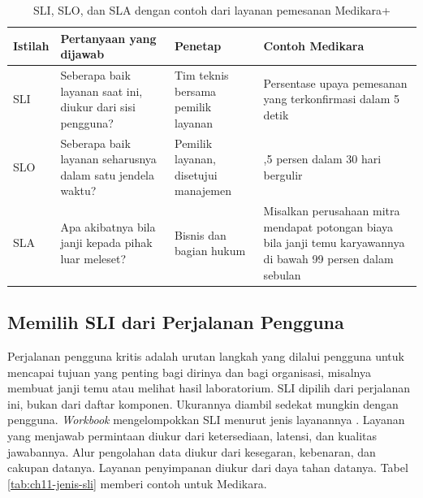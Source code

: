 \begin{table}[!htb]
  \centering
  \caption{SLI, SLO, dan SLA dengan contoh dari layanan pemesanan Medikara+}
  \label{tab:ch11-sli-slo-sla}
  \footnotesize
  \begin{tabularx}{\textwidth}{>{\raggedright\arraybackslash}p{1.1cm} >{\raggedright\arraybackslash}X >{\raggedright\arraybackslash}p{2.3cm} >{\raggedright\arraybackslash}X}
    \hline
    \textbf{Istilah} & \textbf{Pertanyaan yang dijawab} & \textbf{Penetap} & \textbf{Contoh Medikara} \\ \hline
    SLI & Seberapa baik layanan saat ini, diukur dari sisi pengguna? & Tim teknis bersama
      pemilik layanan & Persentase upaya pemesanan yang terkonfirmasi dalam 5 detik \\ \hline
    SLO & Seberapa baik layanan seharusnya dalam satu jendela waktu? & Pemilik layanan,
      disetujui manajemen & 99,5 persen dalam 30 hari bergulir \\ \hline
    SLA & Apa akibatnya bila janji kepada pihak luar meleset? & Bisnis dan bagian hukum &
      Misalkan perusahaan mitra mendapat potongan biaya bila janji temu karyawannya di bawah 99
      persen dalam sebulan \\ \hline
  \end{tabularx}
\end{table}

\subsection{Memilih SLI dari Perjalanan Pengguna}

Perjalanan pengguna kritis adalah urutan langkah yang dilalui pengguna untuk mencapai tujuan yang
penting bagi dirinya dan bagi organisasi, misalnya membuat janji temu atau melihat hasil
laboratorium. SLI dipilih dari perjalanan ini, bukan dari daftar komponen. Ukurannya diambil sedekat
mungkin dengan pengguna. \textit{Workbook} mengelompokkan SLI menurut jenis layanannya
\cite{c11-sre-workbook}. Layanan yang menjawab permintaan diukur dari ketersediaan, latensi, dan
kualitas jawabannya. Alur pengolahan data diukur dari kesegaran, kebenaran, dan cakupan datanya.
Layanan penyimpanan diukur dari daya tahan datanya. Tabel \ref{tab:ch11-jenis-sli} memberi contoh
untuk Medikara.


